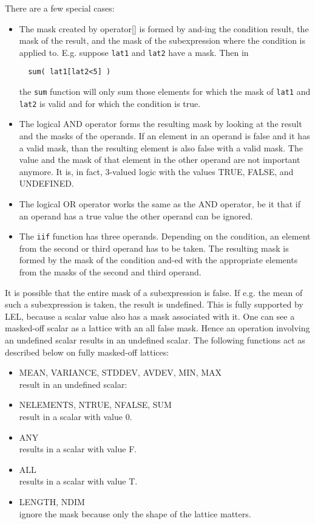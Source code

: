 There are a few special cases:
\begin{itemize}
\item
The mask created by operator[] is formed by and-ing the condition
result, the mask of the result, and the mask of the subexpression
where the condition is applied to. E.g. suppose \texttt{lat1} and
\texttt{lat2} have a mask. Then in
\begin{verbatim}
  sum( lat1[lat2<5] )
\end{verbatim}
the \texttt{sum} function will only sum those elements for which
the mask of \texttt{lat1} and \texttt{lat2} is valid and for which
the condition is true.

\item
The logical AND operator forms the resulting mask by looking at
the result and the masks of the operands. If an element in an
operand is false and it has a valid mask, than the resulting
element is also false with a valid mask. The value and the mask of
that element in the other operand are not important anymore.
It is, in fact, 3-valued logic with the values TRUE, FALSE, and UNDEFINED.

\item
The logical OR operator works the same as the AND operator, be it
that if an operand has a true value the other operand can be ignored.

\item
The \texttt{iif} function has three operands. Depending on the
condition, an element from the second or third operand has to be taken.
The resulting mask is formed by the mask of the condition and-ed
with the appropriate elements from the masks of the second and third operand.
\end{itemize}

It is possible that the entire mask of a subexpression is false.
If e.g. the mean of such a subexpression is taken, the result
is undefined. This is fully supported by LEL, because a scalar
value also has a mask associated with it.
One can see a masked-off scalar as a lattice with an all false mask.
Hence an operation involving an undefined scalar results in an
undefined scalar.
The following functions act as described below on fully masked-off
lattices:
\begin{itemize}
\item MEAN, VARIANCE, STDDEV, AVDEV, MIN, MAX
\\result in an undefined scalar:
\item NELEMENTS, NTRUE, NFALSE, SUM
\\result in a scalar with value 0.
\item ANY
\\results in a scalar with value F.
\item ALL
\\results in a scalar with value T.
\item LENGTH, NDIM
\\ignore the mask because only the shape of the lattice matters.
\end{itemize}


